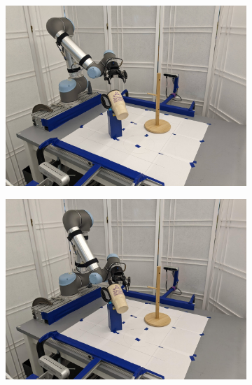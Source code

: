 \documentclass{article}
\begin{document}
\begin{figure}[]
\begin{subfigure}{(\linewidth - 0.05\linewidth)/5}
        \includegraphics[width=\linewidth]{figures/episodes/mug_on_tree/3.jpg}
    \end{subfigure}
    \begin{subfigure}{(\linewidth - 0.05\linewidth)/5}
        \centering
        \includegraphics[width=\linewidth]{figures/episodes/mug_on_tree/4.jpg}
    \end{subfigure}
    \begin{subfigure}{(\linewidth - 0.05\linewidth)/5}
        \centering

\end{subfigure}
\end{figure}
\end{document}
